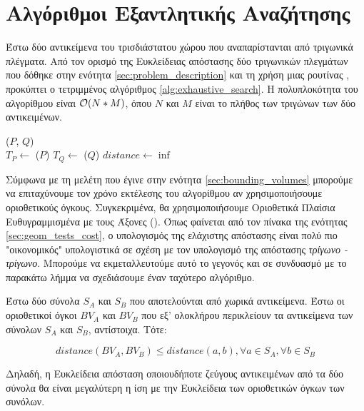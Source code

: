 \section{Αλγόριθμοι Εξαντλητικής Αναζήτησης}
\label{sec:exhaustive_search}
Έστω δύο αντικείμενα του τρισδιάστατου χώρου που αναπαρίστανται από 
τριγωνικά πλέγματα.
Από τον ορισμό της Ευκλείδειας απόστασης δύο τριγωνικών πλεγμάτων που
δόθηκε στην ενότητα \ref{sec:problem_description} και τη χρήση μιας 
ρουτίνας , προκύπτει ο 
τετριμμένος αλγόριθμος \ref{alg:exhaustive_search}. 
Η πολυπλοκότητα του αλγορίθμου είναι $\mathcal{O}(N*M)$, όπου 
$N$ και $M$ είναι το πλήθος των τριγώνων των δύο αντικειμένων.

\IncMargin{1.5em}
\begin{algorithm}[h]
    \DontPrintSemicolon
    \Indm\nonl\exhaustivesearch ($P$, $Q$)\\
    \Indp
        $T_P \gets$ \trias($P$) \;
        $T_Q \gets$ \trias($Q$) \; 
        $distance \gets \inf$ \;

    \caption[Απόσταση Τριγωνικών Πλεγμάτων με Πλήρη Αναζήτηση]{
    }
    \label{alg:exhaustive_search}
\end{algorithm}
\DecMargin{1.5em}

Σύμφωνα με τη μελέτη που έγινε στην ενότητα \ref{sec:bounding_volumes}
μπορούμε να επιταχύνουμε τον χρόνο εκτέλεσης του αλγορίθμου αν 
χρησιμοποιήσουμε οριοθετικούς όγκους.
Συγκεκριμένα, θα χρησιμοποιήσουμε Οριοθετικά Πλαίσια Ευθυγραμμισμένα 
με τους Άξονες (). 
Όπως φαίνεται από τον πίνακα της ενότητας \ref{sec:geom_tests_cost},
ο υπολογισμός της ελάχιστης απόστασης \textit{} είναι πολύ πιο 
"οικονομικός" υπολογιστικά σε σχέση με τον υπολογισμό της απόστασης 
\textit{τρίγωνο - τρίγωνο}.
Μπορούμε να εκμεταλλευτούμε αυτό το γεγονός και σε συνδυασμό με το παρακάτω λήμμα 
να σχεδιάσουμε έναν ταχύτερο αλγόριθμο.

\begin{lemma}
    Έστω δύο σύνολα $S_A$ και $S_B$ που αποτελούνται από χωρικά αντικείμενα. 
    Έστω οι οριοθετικοί όγκοι $BV_A$ και $BV_B$ που εξ' ολοκλήρου περικλείουν 
    τα αντικείμενα των σύνολων  $S_A$ και $S_B$, αντίστοιχα. Τότε:
    
    \[ distance(BV_A, BV_B) \leq distance(a, b) , 
    \forall a \in S_A, \forall b \in S_B \]

    Δηλαδή, η Ευκλείδεια απόσταση οποιουδήποτε ζεύγους αντικειμένων από τα δύο σύνολα 
    θα είναι μεγαλύτερη η ίση με την Ευκλείδεια των οριοθετικών όγκων των συνόλων.
    \label{lemma:box_distance}
\end{lemma}


